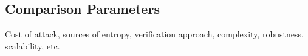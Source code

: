 \subsection{Comparison Parameters}
\label{sub:comparison_parameters}
Cost of attack, sources of entropy, verification approach, complexity, robustness, scalability, etc.

